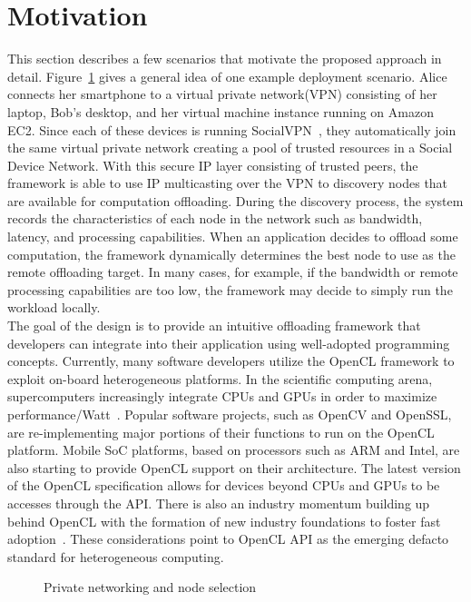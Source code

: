 \section{Motivation}
\label{intro:motivation}
This section describes a few scenarios that motivate the proposed
approach in detail.
%
Figure~\ref{fig:motivation} gives a general idea of one example deployment scenario.
%
Alice connects her smartphone to a virtual private network(VPN)
consisting of her laptop, Bob's desktop, and her virtual machine
instance running on Amazon EC2.
%
Since each of these devices is running SocialVPN~\cite{socialvpn}, they
automatically join the same virtual private network creating a pool of
trusted resources in a Social Device Network.
%
With this secure IP layer consisting of trusted peers, the framework is
able to use IP multicasting over the VPN to discovery nodes that are
available for computation offloading.
%
During the discovery process, the system records the characteristics of
each node in the network such as bandwidth, latency, and processing
capabilities.
%
When an application decides to offload some computation, the framework
dynamically determines the best node to use as the remote offloading
target.
%
In many cases, for example, if the bandwidth or remote processing
capabilities are too low, the framework may decide to simply run the
workload locally.\\
%
The goal of the design is to provide an intuitive offloading framework
that developers can integrate into their application using well-adopted
programming concepts.
%
Currently, many software developers utilize the OpenCL framework to
exploit on-board heterogeneous platforms.
%
In the scientific computing arena, supercomputers increasingly integrate
CPUs and GPUs in order to maximize performance/Watt~\cite{powertutor}.
%
Popular software projects, such as OpenCV and OpenSSL, are
re-implementing major portions of their functions to run on the OpenCL
platform.
%
Mobile SoC platforms, based on processors such as ARM and Intel, are
also starting to provide OpenCL support on their architecture.
%
The latest version of the OpenCL specification allows for devices
beyond CPUs and GPUs to be accesses through the API.
%
There is also an industry momentum building up behind OpenCL with the
formation of new industry foundations to foster fast
adoption~\cite{hsa}.
%
These considerations point to OpenCL API as the emerging defacto
standard for heterogeneous computing.\\
%
\begin{figure}
\centering
{}
\caption{Private networking and node selection}
\label{fig:motivation}
\end{figure}
